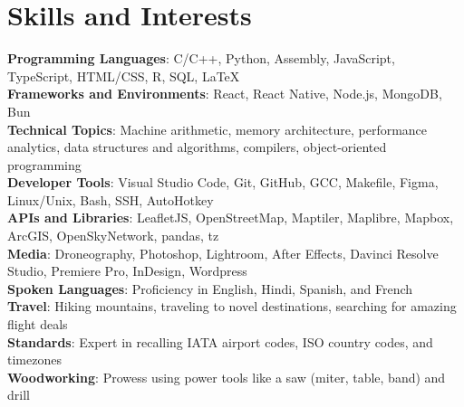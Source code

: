 \documentclass[letterpaper,11pt]{article}
\begin{document}
%
\section{Skills and Interests}
 \begin{itemize}[leftmargin=0in, label={}]
    \small{\item{
     \textbf{Programming Languages}{: C/C++, Python, Assembly, JavaScript, TypeScript, HTML/CSS, R, SQL, LaTeX} \\
     \textbf{Frameworks and Environments}{: React, React Native, Node.js, MongoDB, Bun} \\
     \textbf{Technical Topics}{: Machine arithmetic, memory architecture, performance analytics, data structures and algorithms, compilers, object-oriented programming} \\
     \textbf{Developer Tools}{: Visual Studio Code, Git, GitHub, GCC, Makefile, Figma, Linux/Unix, Bash, SSH, AutoHotkey} \\
     \textbf{APIs and Libraries}{: LeafletJS, OpenStreetMap, Maptiler, Maplibre, Mapbox, ArcGIS, OpenSkyNetwork, pandas, tz} \\
     \textbf{Media}{: Droneography, Photoshop, Lightroom, After Effects, Davinci Resolve Studio, Premiere Pro, InDesign, Wordpress} \\
     \textbf{Spoken Languages}{: Proficiency in English, Hindi, Spanish, and French} \\
     \textbf{Travel}{: Hiking mountains, traveling to novel destinations, searching for amazing flight deals} \\
     \textbf{Standards}{: Expert in recalling IATA airport codes, ISO country codes, and timezones} \\
     \textbf{Woodworking}{: Prowess using power tools like a saw (miter, table, band) and drill} \\
     
    }}
 \end{itemize}
\end{document}
